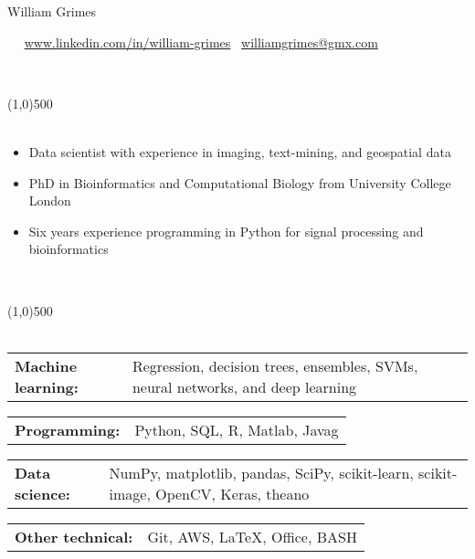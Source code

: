 \documentclass[11pt]{res}
\begin{document}
\centerline{{\Huge William Grimes}}
\vspace{-0.7em}


\Mobilefone \ \textcolor{mygray}{                \hfill}
\ComputerMouse \ \url{www.linkedin.com/in/william-grimes} \hfill 
\Letter \ \href{mailto:williamgrimes@gmx.com}{williamgrimes@gmx.com}

\vspace{-1.0em}
\begin{flushleft}
\\
\end{flushleft}
\vspace{-3.2em}

\line(1,0){500}\\\smallskip
\vspace*{-0.8cm}
\nolinebreak\\
\begin{itemize} %
	\item Data scientist with experience in imaging, text-mining, and geospatial data
	\item PhD in Bioinformatics and Computational Biology from University College London 
	\item Six years experience programming in Python for signal processing and bioinformatics
\end{itemize}

\vspace{-1.2em}
\begin{flushleft}
\\
\end{flushleft}
\vspace{-3.2em}
\line(1,0){500}\\
\vspace*{-0.3cm}
\nolinebreak\\
\begin{tabular}{@{} p{3.3cm} p{14.0cm} @{}} {\bf Machine learning:} & \textcolor{mygray}{Regression, decision trees, ensembles, SVMs, neural networks, and deep learning} \end{tabular}
\begin{tabular}{@{} p{3.3cm} p{14.0cm} @{}} {\bf Programming:} & \textcolor{mygray}{Python, SQL, R, Matlab, Javag}\end{tabular}
\begin{tabular}{@{} p{3.3cm} p{14.0cm} @{}} {\bf Data science:} & \textcolor{mygray}{NumPy, matplotlib, pandas, SciPy, scikit-learn, scikit-image, OpenCV, Keras, theano }\end{tabular}
\begin{tabular}{@{} p{3.3cm} p{14.0cm} @{}} {\bf Other technical:} & \textcolor{mygray}{ Git, AWS, \LaTeX, Office, BASH} \end{tabular}
\end{document}
